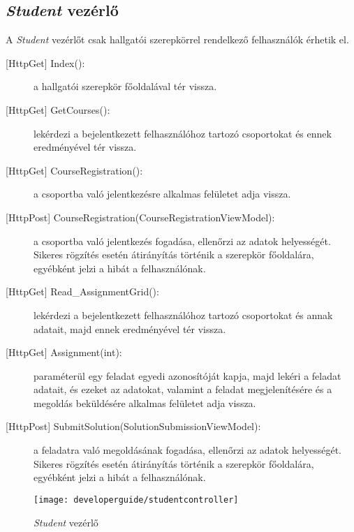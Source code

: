 \subsection{\emph{Student} vezérlő}
A \emph{Student} vezérlőt csak hallgatói szerepkörrel rendelkező felhasználók érhetik el.
\begin{description}
	\item[{[HttpGet]} Index():] a hallgatói szerepkör főoldalával tér vissza.
	\item[{[HttpGet]} GetCourses():] lekérdezi a bejelentkezett felhasználóhoz tartozó csoportokat és ennek eredményével tér vissza.
	\item[{[HttpGet]} CourseRegistration():] a csoportba való jelentkezésre alkalmas felületet adja vissza.
	\item[{[HttpPost]} CourseRegistration(CourseRegistrationViewModel):] a csoportba való jelentkezés fogadása, ellenőrzi az adatok helyességét. Sikeres rögzítés esetén átirányítás történik a szerepkör főoldalára, egyébként jelzi a hibát a felhasználónak.
	\item[{[HttpGet]} Read\_AssignmentGrid():] lekérdezi a bejelentkezett felhasználóhoz tartozó csoportokat és annak adatait, majd ennek eredményével tér vissza.
	\item[{[HttpGet]} Assignment(int):] paraméterül egy feladat egyedi azonosítóját kapja, majd lekéri a feladat adatait, és ezeket az adatokat, valamint a feladat megjelenítésére és a megoldás beküldésére alkalmas felületet adja vissza.
	\item[{[HttpPost]} SubmitSolution(SolutionSubmissionViewModel):] a feladatra való megoldásának fogadása, ellenőrzi az adatok helyességét. Sikeres rögzítés esetén átirányítás történik a szerepkör főoldalára, egyébként jelzi a hibát a felhasználónak.
\end{description}
\begin{figure}[H]
	\centering
	\texttt{[image: developerguide/studentcontroller]}
	\caption{\emph{Student} vezérlő}
	\label{fig:studentcontroller}
\end{figure}
